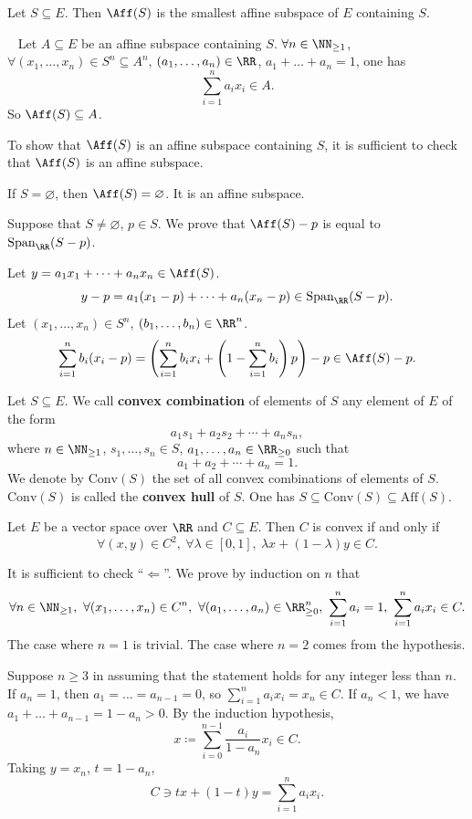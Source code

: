 \begin{propositionenv}
    Let $S\subseteq E$. Then $\Aff(S)$ is the smallest affine subspace of $E$ containing $S$.
\end{propositionenv}
\begin{proofenv}
    \ \newline
    Let $A\subseteq E$ be an affine subspace containing $S$. $\forall n\in\NN_{\ge1}$, $\forall (x_1,\dots,x_n)\in S^n\subseteq A^n$, $(a_1,\dots,a_n)\in \RR$, $a_1+\dots+a_n=1$, one has
    $$\sum_{i=1}^n a_i x_i\in A.$$
    So $\Aff(S)\subseteq A$.

    \quad To show that $\Aff(S)$ is an affine subspace containing $S$, it is sufficient to check that $\Aff(S)$ is an affine subspace.

    \quad If $S=\varnothing$, then $\Aff(S)=\varnothing$. It is an affine subspace.

    Suppose that $S\neq \varnothing$, $p\in S$. We prove that $\Aff(S)-p$ is equal to $\mathrm{Span}_\RR (S-p)$. 
    
    Let $y=a_1x_1+\dots+a_nx_n\in \Aff(S)$.
    $$y-p=a_1(x_1-p)+\dots+a_n(x_n-p)\in \mathrm{Span} _\RR (S-p).$$
    Let $(x_1,\dots,x_n)\in S^n$, $(b_1,\dots,b_n)\in \RR^n$.
    $$\sum_{i=1}^n b_i (x_i - p)=\left(\sum_{i=1}^n b_i x_i+ \left(1-\sum_{i=1}^n b_i\right)p\right)   - p\in \Aff(S)-p.$$
\end{proofenv}
\begin{definitionenv}
    Let $S\subseteq E$. We call \textbf{convex combination} of elements of $S$ any element of $E$ of the form
    $$a_1s_1+a_2s_2+\cdots+a_ns_n,$$
    where $n\in\NN_{\ge1}$, $s_1,\ldots,s_n\in S$, $a_1,\ldots,a_n\in \RR_{\ge 0}$ such that
    $$a_1+a_2+\cdots+a_n=1.$$
    We denote by $\mathrm{Conv}(S)$ the set of all convex combinations of elements of $S$. $\mathrm{Conv}(S)$ is called the \textbf{convex hull} of $S$. One has $S\subseteq \mathrm{Conv}(S)\subseteq \mathrm{Aff}(S)$.
\end{definitionenv}
\begin{propositionenv}
    Let $E$ be a vector space over $\RR$ and $C\subseteq E$. Then $C$ is convex if and only if
    $$\forall (x,y)\in C^2,\  \forall \lambda\in [0,1],\  \lambda x+(1-\lambda)y\in C.$$
\end{propositionenv}
\begin{proofenv}
    It is sufficient to check ``$\Leftarrow$''. We prove by induction on $n$ that 
    $$\forall n\in \NN_{\ge1},\ \forall (x_1,\ldots,x_n)\in C^n,\ \forall (a_1,\ldots,a_n)\in \RR^n_{\ge 0},\ \sum_{i=1}^n a_i=1,\ \sum_{i=1}^n a_i x_i\in C.$$
    The case where $n=1$ is trivial. The case where $n=2$  comes from the hypothesis. 

    Suppose $n\ge 3$ in assuming that the statement holds for any integer less than $n$. If $a_n=1$, then $a_1=\dots=a_{n-1}=0$, so $\sum_{i=1}^n a_i x_i=x_n\in C$. If $a_n< 1$, we have $a_1+\dots+a_{n-1}=1-a_n>0$. By the induction hypothesis,
    $$x\coloneq \sum_{i=0}^{n-1} \frac{a_i}{1-a_n} x_i\in C.$$
    Taking $y=x_n$, $t=1-a_n$,
    $$C\ni tx+(1-t)y=\sum_{i=1}^{n} a_ix_i.$$
\end{proofenv}

